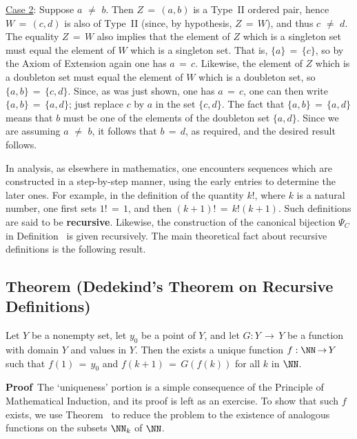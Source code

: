 \V

        \underline{Case 2}: Suppose $a \,\,{\neq}\,\, b$. Then $Z \,=\, (a,b)$ is a Type~II ordered pair,
    hence $W \,=\, (c,d)$ is also of Type~II (since, by hypothesis, $Z \,=\, W$), and thus $c \,\,{\neq}\,\, d$.
    The equality $Z \,=\, W$ also implies that the element of $Z$ which is a singleton set must equal the element of $W$ which is a singleton set. That is, $\{a\} \,=\, \{c\}$, so by the Axiom of Extension again one has $a \,=\, c$.
    Likewise, the element of $Z$ which is a doubleton set must equal the element of $W$ which is a doubleton set,
    so $\{a,b\} \,=\, \{c,d\}$. Since, as was just shown, one has $a \,=\, c$, one can then write $\{a,b\} \,=\, \{a,d\}$;
    just replace $c$ by $a$ in the set $\{c,d\}$. The fact that $\{a,b\} \,=\, \{a,d\}$ means that $b$ must be one of the elements of the doubleton set $\{a,d\}$. Since we are assuming $a \,\,{\neq}\,\, b$, it follows that $b \,=\, d$, as required, and the desired result follows.

\VV

        In analysis, as elsewhere in mathematics, one encounters sequences which are constructed in a step-by-step manner,
    using the early entries to determine the later ones. For example, in the definition of the quantity $k!$,
    where $k$ is a natural number, one first sets $1! \,=\, 1$, and then $(k+1)! \,=\, k!(k+1)$.
    Such definitions are said to be {\bf recursive}.
    Likewise, the construction of the canonical bijection ${\Psi}_{C}$ in Definition~ is given recursively.
    The main theoretical fact about recursive definitions is the following result.

\V

        \subsection{\small{{\bf Theorem}} (Dedekind's Theorem on Recursive Definitions)}
        \label{ThmA40.100}

        Let $Y$ be a nonempty set, let $y_{0}$ be a point of $Y$, and let $G:Y \,{\rightarrow}\, Y$ be a function with domain $Y$ and values in $Y$.
    Then the exists a unique function $f:{\NN} \,{\rightarrow}\, Y$ such that $f(1) \,=\, y_{0}$ and $f(k+1) \,=\, G(f(k))$ for all $k$ in ${\NN}$.

\V

        {\bf Proof}\,  The `uniqueness' portion is a simple consequence of the Principle of Mathematical Induction, and its proof is left as an exercise.
        To show that such $f$ exists, we use Theorem~ to reduce the problem to the existence of analogous functions on the subsets ${\NN}_{k}$ of ${\NN}$.

